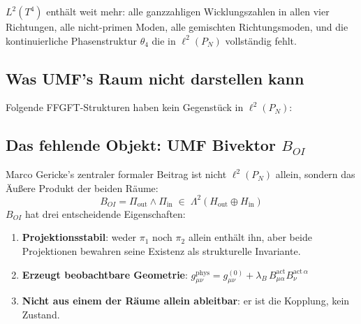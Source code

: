 $L^2(T^4)$ enthält weit mehr: alle ganzzahligen Wicklungszahlen in allen vier
Richtungen, alle nicht-primen Moden, alle gemischten Richtungsmoden, und die
kontinuierliche Phasenstruktur $\theta_4$ die in $\ell^2(P_N)$ vollständig fehlt.

\subsection{Was UMF's Raum nicht darstellen kann}

Folgende FFGFT-Strukturen haben kein Gegenstück in $\ell^2(P_N)$:

\begin{center}
\renewcommand{\arraystretch}{1.4}
{\small
{}
}
\end{center}

\subsection{Das fehlende Objekt: UMF Bivektor \texorpdfstring{$B_{OI}$}{B\_OI}}
\label{sec:bivector}

Marco Gericke's zentraler formaler Beitrag ist nicht $\ell^2(P_N)$ allein,
sondern das Äußere Produkt der beiden Räume:
\begin{equation}
  B_{OI} = \Pi_\text{out} \wedge \Pi_\text{in}
  \;\in\; \Lambda^2(H_\text{out} \oplus H_\text{in})
  \tag{244.4b}
\end{equation}
$B_{OI}$ hat drei entscheidende Eigenschaften:
\begin{enumerate}
  \item \textbf{Projektionsstabil}: weder $\pi_1$ noch $\pi_2$ allein enthält ihn,
    aber beide Projektionen bewahren seine Existenz als strukturelle Invariante.
  \item \textbf{Erzeugt beobachtbare Geometrie}:
    $g_{\mu\nu}^\text{phys} = g_{\mu\nu}^{(0)} + \lambda_B\,
    B_{\mu\alpha}^\text{act} B_{\nu}^{\text{act}\,\alpha}$
  \item \textbf{Nicht aus einem der Räume allein ableitbar}: er ist die Kopplung,
    kein Zustand.
\end{enumerate}

